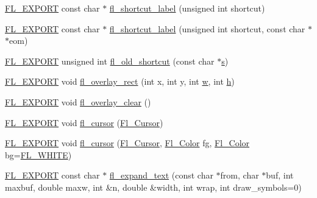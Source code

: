 \begin{DoxyCompactItemize}
\item 
\hyperlink{_fl___export_8_h_aa9ba29a18aee9d738370a06eeb4470fc}{F\+L\+\_\+\+E\+X\+P\+O\+RT} const char $\ast$ \hyperlink{group__fl__drawings_gadfd8bd4a9143e4238da84d031bfd1815}{fl\+\_\+shortcut\+\_\+label} (unsigned int shortcut)
\item 
\hyperlink{_fl___export_8_h_aa9ba29a18aee9d738370a06eeb4470fc}{F\+L\+\_\+\+E\+X\+P\+O\+RT} const char $\ast$ \hyperlink{group__fl__drawings_ga035deb6aa074fd5df1419412ba370410}{fl\+\_\+shortcut\+\_\+label} (unsigned int shortcut, const char $\ast$$\ast$eom)
\item 
\hyperlink{_fl___export_8_h_aa9ba29a18aee9d738370a06eeb4470fc}{F\+L\+\_\+\+E\+X\+P\+O\+RT} unsigned int \hyperlink{group__fl__drawings_ga6f6f1aea3b90a03c1714336e7aef349d}{fl\+\_\+old\+\_\+shortcut} (const char $\ast$\hyperlink{forms_8_h_a672b4f0a8c8a6db61068c721f799d87f}{s})
\item 
\hyperlink{_fl___export_8_h_aa9ba29a18aee9d738370a06eeb4470fc}{F\+L\+\_\+\+E\+X\+P\+O\+RT} void \hyperlink{group__fl__drawings_gab0856445ac32f9b4606bca24cce63c7e}{fl\+\_\+overlay\+\_\+rect} (int x, int y, int \hyperlink{forms_8_h_aac374e320caaadeca4874add33b62af2}{w}, int \hyperlink{forms_8_h_a7e427ba5b307f9068129699250690066}{h})
\item 
\hyperlink{_fl___export_8_h_aa9ba29a18aee9d738370a06eeb4470fc}{F\+L\+\_\+\+E\+X\+P\+O\+RT} void \hyperlink{group__fl__drawings_ga9d2c84bf8448312d165c286458e4984d}{fl\+\_\+overlay\+\_\+clear} ()
\item 
\hyperlink{_fl___export_8_h_aa9ba29a18aee9d738370a06eeb4470fc}{F\+L\+\_\+\+E\+X\+P\+O\+RT} void \hyperlink{group__fl__drawings_gac34f54a80fa846cf66f160bc02940bd2}{fl\+\_\+cursor} (\hyperlink{_enumerations_8_h_a72bde974edc7926b1217dd51b8c7e8e0}{Fl\+\_\+\+Cursor})
\item 
\hyperlink{_fl___export_8_h_aa9ba29a18aee9d738370a06eeb4470fc}{F\+L\+\_\+\+E\+X\+P\+O\+RT} void \hyperlink{group__fl__drawings_ga55c8e6d223e29367800325c61b0d840f}{fl\+\_\+cursor} (\hyperlink{_enumerations_8_h_a72bde974edc7926b1217dd51b8c7e8e0}{Fl\+\_\+\+Cursor}, \hyperlink{_enumerations_8_h_a8b762953646f8abee866061f1af78a6a}{Fl\+\_\+\+Color} fg, \hyperlink{_enumerations_8_h_a8b762953646f8abee866061f1af78a6a}{Fl\+\_\+\+Color} bg=\hyperlink{_enumerations_8_h_ac1600c6c32be996f90f133cdc4135292}{F\+L\+\_\+\+W\+H\+I\+TE})
\item 
\hyperlink{_fl___export_8_h_aa9ba29a18aee9d738370a06eeb4470fc}{F\+L\+\_\+\+E\+X\+P\+O\+RT} const char $\ast$ \hyperlink{group__fl__drawings_ga9e893bce710f855228890cfb3026b953}{fl\+\_\+expand\+\_\+text} (const char $\ast$from, char $\ast$buf, int maxbuf, double maxw, int \&n, double \&width, int wrap, int draw\+\_\+symbols=0)
$$
\end{DoxyCompactItemize}

